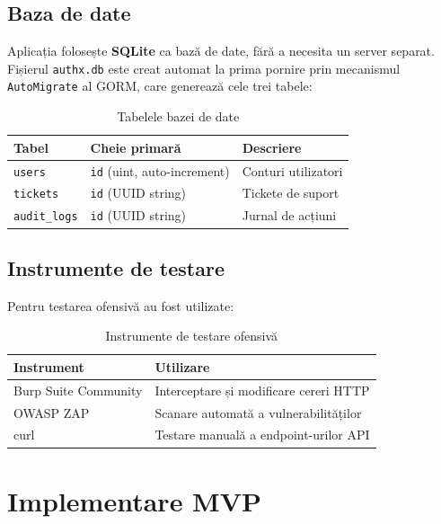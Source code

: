 \documentclass[12pt]{article}
\begin{document}
\subsection{Baza de date}

Aplicația folosește \textbf{SQLite} ca bază de date, fără a necesita un server separat.
Fișierul \texttt{authx.db} este creat automat la prima pornire prin mecanismul
\texttt{AutoMigrate} al GORM, care generează cele trei tabele:

\begin{table}[H]
\centering
\begin{tabular}{|l|l|l|}
\hline
\textbf{Tabel} & \textbf{Cheie primară} & \textbf{Descriere} \\
\hline
\texttt{users}       & \texttt{id} (uint, auto-increment) & Conturi utilizatori \\
\texttt{tickets}     & \texttt{id} (UUID string)          & Tickete de suport \\
\texttt{audit\_logs} & \texttt{id} (UUID string)          & Jurnal de acțiuni \\
\hline
\end{tabular}
\caption{Tabelele bazei de date}
\end{table}

\subsection{Instrumente de testare}

Pentru testarea ofensivă au fost utilizate:

\begin{table}[H]
\centering
\begin{tabular}{|l|l|}
\hline
\textbf{Instrument}  & \textbf{Utilizare} \\
\hline
Burp Suite Community & Interceptare și modificare cereri HTTP \\
OWASP ZAP            & Scanare automată a vulnerabilităților \\
curl                 & Testare manuală a endpoint-urilor API \\
\hline
\end{tabular}
\caption{Instrumente de testare ofensivă}
\end{table}

\newpage
\section{Implementare MVP}
\end{document}
